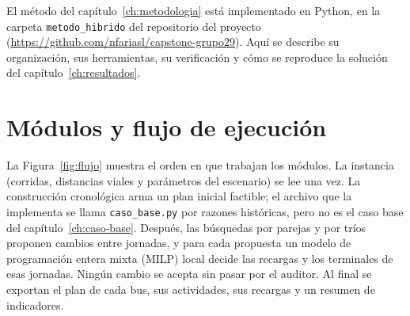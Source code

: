 
El método del capítulo~\ref{ch:metodologia} está implementado en Python, en la carpeta \texttt{metodo\_hibrido} del repositorio del proyecto (\url{https://github.com/nfariasl/capstone-grupo29}). Aquí se describe su organización, sus herramientas, su verificación y cómo se reproduce la solución del capítulo~\ref{ch:resultados}.

\section{Módulos y flujo de ejecución}
\label{sec:modulos}

La Figura~\ref{fig:flujo} muestra el orden en que trabajan los módulos. La instancia (corridas, distancias viales y parámetros del escenario) se lee una vez. La construcción cronológica arma un plan inicial factible; el archivo que la implementa se llama \texttt{caso\_base.py} por razones históricas, pero no es el caso base del capítulo~\ref{ch:caso-base}. Después, las búsquedas por parejas y por tríos proponen cambios entre jornadas, y para cada propuesta un modelo de programación entera mixta (MILP) local decide las recargas y los terminales de esas jornadas. Ningún cambio se acepta sin pasar por el auditor. Al final se exportan el plan de cada bus, sus actividades, sus recargas y un resumen de indicadores.

